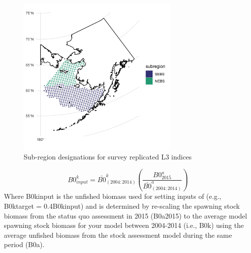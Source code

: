 \documentclass[
]{article}
\begin{document}
\begin{figure}
\centering
\includegraphics[width=0.7\textwidth,height=\textheight]{Figs/stations_NS.jpg}
\caption{Sub-region designations for survey replicated L3 indices}
\end{figure}

\[B0^k_{input}= \bar{B0}^k_{(2004:2014)}\left(\frac{B0^{a}_{2015}}{\bar{B0}^a_{(2004:2014)}}\right) \]
Where B0kinput is the unfished biomass used for setting inputs of (e.g.,
B0ktarget = 0.4B0kinput) and is determined by re-scaling the spawning
stock biomass from the status quo assessment in 2015 (B0a2015) to the
average model spawning stock biomass for your model between 2004-2014
(i.e., B0k) using the average unfished biomass from the stock assessment
model during the same period (B0a).
\end{document}

